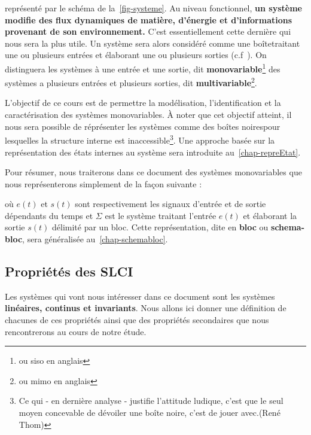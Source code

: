 représenté par le schéma de la~\cref{fig-systeme}.
Au niveau fonctionnel, \textbf{un système modifie des flux dynamiques 
de matière, d'énergie et d'informations provenant 
de son environnement.}
C'est essentiellement cette dernière qui nous sera la plus utile.
Un système sera alors considéré comme une \og boîte\fg traitant une 
ou plusieurs entrées et élaborant une ou plusieurs sorties 
(c.f~). On distinguera les systèmes à 
une entrée et une sortie, dit \textbf{monovariable}\footnote{ou \gls{siso} 
en anglais} des systèmes  a plusieurs entrées et plusieurs sorties, dit 
\textbf{multivariable}\footnote{ou \gls{mimo} en anglais}.

L'objectif de ce cours est de permettre la modélisation, 
l'identification et la caractérisation des systèmes monovariables. 
\`A noter que cet objectif atteint, il nous sera possible de réprésenter 
les systèmes comme des \og boîtes noires\fg pour lesquelles la structure 
interne est inaccessible\footnote{\og Ce qui - en dernière analyse - justifie 
l'attitude ludique, c'est que le seul moyen concevable de dévoiler une 
boîte noire, c'est de jouer avec.\fg (René Thom)}. Une approche basée 
sur la représentation des états internes au système sera 
introduite au~\cref{chap-repreEtat}. 

Pour résumer, nous traiterons dans ce document 
des systèmes monovariables que nous représenterons simplement 
de la façon suivante :
\begin{center}
    
\end{center}
où $e(t)$ et $s(t)$ sont respectivement les signaux d'entrée et de sortie 
dépendants du temps et $\Sigma$ est le système traitant l'entrée $e(t)$ et 
élaborant la sortie $s(t)$ délimité par un bloc. 
Cette représentation, dite en \textbf{bloc} ou 
\textbf{schema-bloc}, sera généralisée au~\cref{chap-schemabloc}.
\clearpage
\restoregeometry
\subsection{Propriétés des SLCI}
Les systèmes qui vont nous intéresser dans ce document sont les systèmes
\textbf{linéaires, continus et invariants}. Nous allons ici donner une 
définition de chacunes de ces propriétés ainsi que des propriétés secondaires 
que nous rencontrerons au cours de notre étude.
